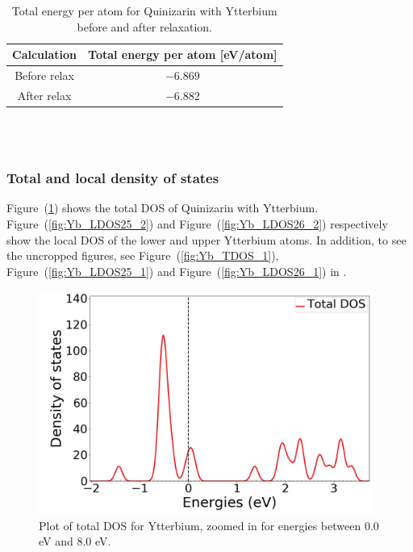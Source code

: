 \documentclass{article}
\begin{document}
      \begin{table}[H]
        \centering
        \caption{Total energy per atom for Quinizarin with Ytterbium before and after relaxation. }
        \label{tab:TOTENYb}
        \begin{tabular}{|c|c|}
            \hline
            Calculation & Total energy per atom [eV/atom]  \\
            \hline \hline
            Before relax & $-6.869$ \\
            After relax & $-6.882$ \\
            \hline
        \end{tabular} \\
        \hspace{0pt}\\
      \end{table}

      \vspace{1cm}

    \subsubsection{Total and local density of states}

      Figure~(\ref{fig:Yb_TDOS_2}) shows the total DOS of Quinizarin with Ytterbium. Figure~(\ref{fig:Yb_LDOS25_2}) and Figure~(\ref{fig:Yb_LDOS26_2}) respectively show the local DOS of the lower and upper Ytterbium atoms. In addition, to see the uncropped figures, see Figure~(\ref{fig:Yb_TDOS_1}), Figure~(\ref{fig:Yb_LDOS25_1}) and Figure~(\ref{fig:Yb_LDOS26_1}) in .

      \begin{figure}[H]
        \centering
        \includegraphics[width = 11cm]{../fig/Yb_TDOS_2.png}
        \caption{Plot of total DOS for Ytterbium, zoomed in for energies between 0.0 eV and 8.0 eV. }
        \label{fig:Yb_TDOS_2}
      \end{figure}
\end{document}
